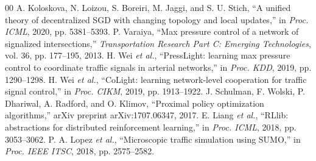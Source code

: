 \documentclass[conference]{IEEEtran}
\begin{document}
\begin{thebibliography}{00}
 A. Koloskova, N. Loizou, S. Boreiri, M. Jaggi, and S. U. Stich, ``A unified theory of decentralized SGD with changing topology and local updates,'' in \textit{Proc. ICML}, 2020, pp. 5381--5393.
 P. Varaiya, ``Max pressure control of a network of signalized intersections,'' \textit{Transportation Research Part C: Emerging Technologies}, vol. 36, pp. 177--195, 2013.
 H. Wei \textit{et al.}, ``PressLight: learning max pressure control to coordinate traffic signals in arterial networks,'' in \textit{Proc. KDD}, 2019, pp. 1290--1298.
 H. Wei \textit{et al.}, ``CoLight: learning network-level cooperation for traffic signal control,'' in \textit{Proc. CIKM}, 2019, pp. 1913--1922.
 J. Schulman, F. Wolski, P. Dhariwal, A. Radford, and O. Klimov, ``Proximal policy optimization algorithms,'' arXiv preprint arXiv:1707.06347, 2017.
 E. Liang \textit{et al.}, ``RLlib: abstractions for distributed reinforcement learning,'' in \textit{Proc. ICML}, 2018, pp. 3053--3062.
 P. A. Lopez \textit{et al.}, ``Microscopic traffic simulation using SUMO,'' in \textit{Proc. IEEE ITSC}, 2018, pp. 2575--2582.
\end{thebibliography}
\end{document}
